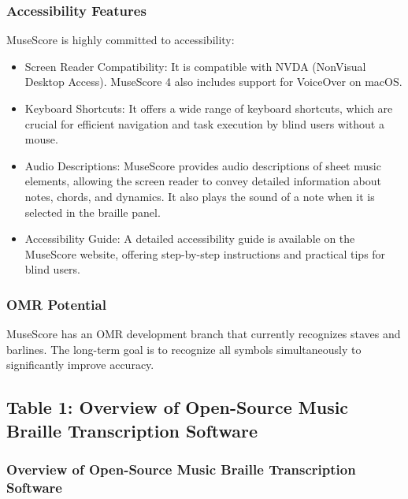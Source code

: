 \subsubsection{Accessibility Features}
MuseScore is highly committed to accessibility:
\begin{itemize}
    \item Screen Reader Compatibility: It is compatible with NVDA (NonVisual Desktop Access). \cite{soundwithoutsight-musescore, musescore-braille} MuseScore 4 also includes support for VoiceOver on macOS. \cite{daisy-musicxml}
    \item Keyboard Shortcuts: It offers a wide range of keyboard shortcuts, which are crucial for efficient navigation and task execution by blind users without a mouse. \cite{musescore-accessibility, musescore-braille}
    \item Audio Descriptions: MuseScore provides audio descriptions of sheet music elements, allowing the screen reader to convey detailed information about notes, chords, and dynamics. \cite{musescore-braille} It also plays the sound of a note when it is selected in the braille panel. \cite{musescore-braille}
    \item Accessibility Guide: A detailed accessibility guide is available on the MuseScore website, offering step-by-step instructions and practical tips for blind users. \cite{soundwithoutsight-musescore, musescore-accessibility}
\end{itemize}

\subsubsection{OMR Potential}
MuseScore has an OMR development branch that currently recognizes staves and barlines. \cite{musescore-omr} The long-term goal is to recognize all symbols simultaneously to significantly improve accuracy. \cite{musescore-omr}

\subsection{Table 1: Overview of Open-Source Music Braille Transcription Software}

\subsubsection{Overview of Open-Source Music Braille Transcription Software}

